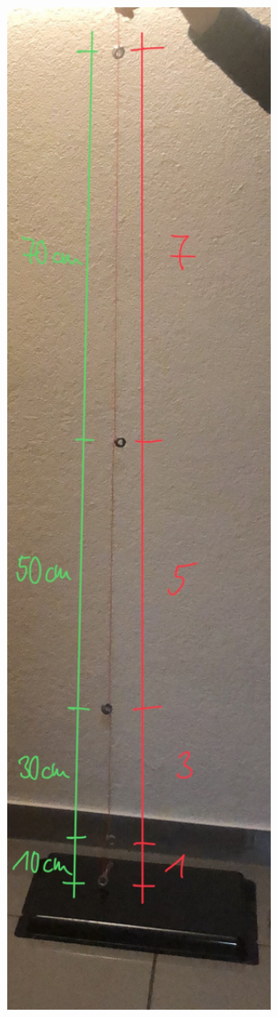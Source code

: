 \documentclass[../main.tex]{subfiles}
\begin{document}
\begin{tcolorbox}
\begin{minipage}[]{0.2\textwidth}
        \includegraphics[width=0.85\textwidth]{img/versuchsaufbau}
    \end{minipage}


\end{tcolorbox}
\end{document}
